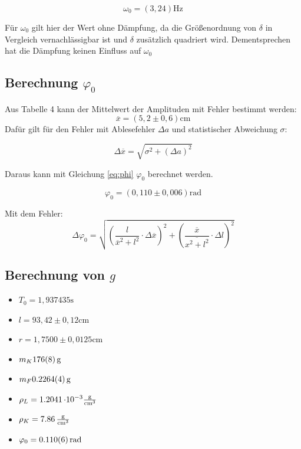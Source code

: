 \[ \omega_0 = (3,24 ) \si{\Hz} \]

Für $\omega_0$ gilt hier der Wert ohne Dämpfung, da die Größenordnung von $\delta$ in Vergleich vernachlässigbar ist und $\delta$ zusätzlich quadriert wird.
Dementsprechen hat die Dämpfung keinen Einfluss auf $\omega_0$

\subsection{Berechnung $\varphi_0$}
Aus Tabelle 4 kann der Mittelwert der Amplituden mit Fehler bestimmt werden:
\[ \overline{x} = (5,2 \pm 0,6) \si{\cm}\]
Dafür gilt für den Fehler mit Ablesefehler $\Delta a$ und statistischer Abweichung $\sigma$:

\begin{equation}
    \Delta \overline{x} = \sqrt{\sigma^2 + (\Delta a)^2}
\end{equation}

Daraus kann mit Gleichung \ref{eq:phi} $\varphi_0$ berechnet werden.

\[\varphi_0 =( 0,110 \pm 0,006 )\si{\text{rad}}\]

Mit dem Fehler:
\begin{equation}
\Delta \varphi_{0} = 
\sqrt{ \left( \frac{l}{\overline{x}^{2} + l^{2}} \cdot \Delta \overline{x} \right)^{2} 
    + \left( \frac{\overline{x}}{\overline{x^{2} + l^{2}}} \cdot \Delta l \right)^{2} }
\end{equation}

\subsection{Berechnung von $g$}
\begin{itemize}
    \item $T_0 = 1,937435 \si{\second}$
    \item $l = 93,42 \pm 0,12 \si{\cm}$
    \item $r = 1,7500 \pm 0,0125 \si{\cm}$
    \item $m_K \SI{176 \pm 8}{\gram}$
    \item $m_F \SI{0,2264 \pm 0,0004}{\gram}$
    \item $\rho_L = \SI{1,2041}{\cdot 10^{-3} \frac{\gram}{\cm^3}}$
    \item $\rho_K = \SI{7,86}{ \frac{\gram}{\cm^3}}$
    \item $ \varphi_0  = \SI{0,110 \pm 0,006}{\text{rad}}$
\end{itemize}


